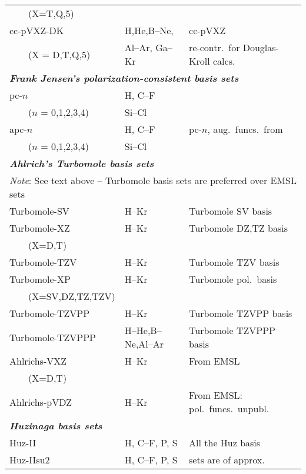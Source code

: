 \begin{longtable}{lll}
 ~~~~(X=T,Q,5) & & \\
cc-pVXZ-DK & H,He,B--Ne, & \cite{thdjcp90,dewthdjcp100,dewthdjcp98,akwdewkapthdjcp110} 
  cc-pVXZ \\
 ~~~~(X = D,T,Q,5) & Al--Ar, Ga--Kr & re-contr.\ for Douglas-Kroll calcs.\\
\hline
\multicolumn{3}{l}{\bf{\emph{Frank Jensen's polarization-consistent basis 
sets\index{basis set!polarization-consistent}\index{polarization-consistent basis set}}}} \\
pc-$n$ & H, C--F & \cite{fjjcp115,fjjcp116} \\
 ~~~~($n$ = 0,1,2,3,4) & Si--Cl & \cite{fjthjcp121} \\
apc-$n$ & H, C--F & pc-$n$, aug.\ funcs.\ from \cite{fjjcp117} \\
 ~~~~($n$ = 0,1,2,3,4) & Si--Cl & \cite{fjthjcp121} \\
\hline
\multicolumn{3}{l}{\bf{\emph{Ahlrich's Turbomole basis sets}}} \\
\multicolumn{3}{l}{\emph{Note}: See text above -- Turbomole basis sets are preferred over EMSL sets} \\
Turbomole-SV & H--Kr & \cite{ashhrajcp97} Turbomole SV basis\\
Turbomole-XZ & H--Kr & \cite{ashhrajcp97} Turbomole DZ,TZ basis\\
 ~~~~(X=D,T) & & \\
Turbomole-TZV & H--Kr & \cite{aschrajcp100} Turbomole TZV basis \\
Turbomole-XP & H--Kr & \cite{ashhrajcp97,aschrajcp100} Turbomole pol.\ basis \\
 ~~~~(X=SV,DZ,TZ,TZV) & & \\
Turbomole-TZVPP & H--Kr & \cite{aschrajcp100} Turbomole TZVPP basis \\
Turbomole-TZVPPP & H--He,B--Ne,Al--Ar & \cite{aschrajcp100} Turbomole TZVPPP basis \\
Ahlrichs-VXZ & H--Kr & \cite{ashhrajcp97} From EMSL \\
 ~~~~(X=D,T) & & \\
Ahlrichs-pVDZ & H--Kr & \cite{ashhrajcp97} From EMSL: pol.\ funcs.\ unpubl.\\
\hline
%
\multicolumn{3}{l}{\bf{\emph{Huzinaga basis sets}}} \\
Huz-II & H, C--F, P, S & \cite{wkijc19,mswkjcp76,huzinagaintern} All the Huz basis \\
Huz-IIsu2 & H, C--F, P, S & \cite{wkijc19,mswkjcp76,huzinagaintern} sets are of approx.\ \\

\end{longtable}
